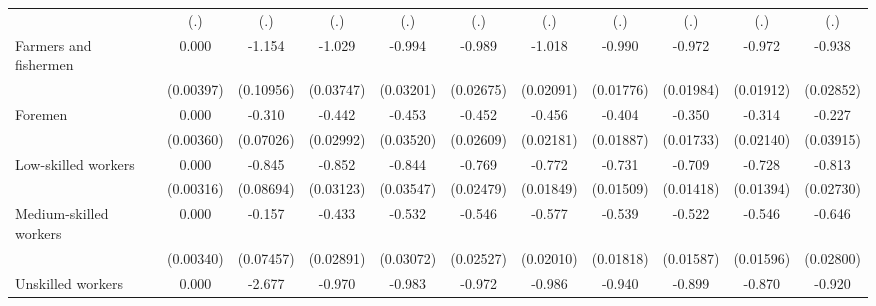 {\begin{tabular}{l*{10}{c}}
                    &         (.)         &         (.)         &         (.)         &         (.)         &         (.)         &         (.)         &         (.)         &         (.)         &         (.)         &         (.)         \\
Farmers and fishermen&       0.000         &      -1.154\sym{***}&      -1.029\sym{***}&      -0.994\sym{***}&      -0.989\sym{***}&      -1.018\sym{***}&      -0.990\sym{***}&      -0.972\sym{***}&      -0.972\sym{***}&      -0.938\sym{***}\\
                    &   (0.00397)         &   (0.10956)         &   (0.03747)         &   (0.03201)         &   (0.02675)         &   (0.02091)         &   (0.01776)         &   (0.01984)         &   (0.01912)         &   (0.02852)         \\
Foremen             &       0.000         &      -0.310\sym{***}&      -0.442\sym{***}&      -0.453\sym{***}&      -0.452\sym{***}&      -0.456\sym{***}&      -0.404\sym{***}&      -0.350\sym{***}&      -0.314\sym{***}&      -0.227\sym{***}\\
                    &   (0.00360)         &   (0.07026)         &   (0.02992)         &   (0.03520)         &   (0.02609)         &   (0.02181)         &   (0.01887)         &   (0.01733)         &   (0.02140)         &   (0.03915)         \\
Low-skilled workers &       0.000         &      -0.845\sym{***}&      -0.852\sym{***}&      -0.844\sym{***}&      -0.769\sym{***}&      -0.772\sym{***}&      -0.731\sym{***}&      -0.709\sym{***}&      -0.728\sym{***}&      -0.813\sym{***}\\
                    &   (0.00316)         &   (0.08694)         &   (0.03123)         &   (0.03547)         &   (0.02479)         &   (0.01849)         &   (0.01509)         &   (0.01418)         &   (0.01394)         &   (0.02730)         \\
Medium-skilled workers&       0.000         &      -0.157\sym{*}  &      -0.433\sym{***}&      -0.532\sym{***}&      -0.546\sym{***}&      -0.577\sym{***}&      -0.539\sym{***}&      -0.522\sym{***}&      -0.546\sym{***}&      -0.646\sym{***}\\
                    &   (0.00340)         &   (0.07457)         &   (0.02891)         &   (0.03072)         &   (0.02527)         &   (0.02010)         &   (0.01818)         &   (0.01587)         &   (0.01596)         &   (0.02800)         \\
Unskilled workers   &       0.000         &      -2.677\sym{***}&      -0.970\sym{***}&      -0.983\sym{***}&      -0.972\sym{***}&      -0.986\sym{***}&      -0.940\sym{***}&      -0.899\sym{***}&      -0.870\sym{***}&      -0.920\sym{***}\\

\end{tabular}}

